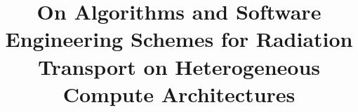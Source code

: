 \documentclass[11pt,onehalf]{general/beavtex}
\title{On Algorithms and Software Engineering Schemes for Radiation Transport on Heterogeneous Compute Architectures}
\author{\TheAuthors{}}
\newcommand{\TheAuthors}{Joanna Piper Morgan}
\begin{document}
\maketitle

\mainmatter



\newcommand{\TheTitle}{BLANK}
\renewcommand{\TheAuthors}{BLANK}
\newcommand{\TheAddress}{BLANK}







\newpage


\printbibliography[]


\appendix

\newpage

\end{document}
